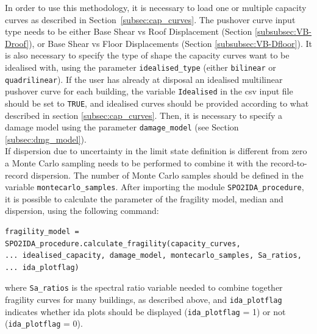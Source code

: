 In order to use this methodology, it is necessary to load one or multiple capacity curves as described in Section~\ref{subsec:cap_curves}. The pushover curve input type needs to be either Base Shear vs Roof Displacement (Section \ref{subsubsec:VB-Droof}), or Base Shear vs Floor Displacements (Section \ref{subsubsec:VB-Dfloor}). It is also necessary to specify the type of shape the capacity curves want to be idealised with, using the parameter \verb=idealised_type= (either \verb=bilinear= or \verb=quadrilinear=). If the user has already at disposal an idealised multilinear pushover curve for each building, the variable \verb=Idealised= in the csv input file should be set to \verb=TRUE=, and idealised curves should be provided according to what described in section \ref{subsec:cap_curves}. Then, it is necessary to specify a damage model using the parameter \verb=damage_model= (see Section \ref{subsec:dmg_model}).\\

If dispersion due to uncertainty in the limit state definition is different from zero a Monte Carlo sampling needs to be performed to combine it with the record-to-record dispersion. The number of Monte Carlo samples should be defined in the variable \verb=montecarlo_samples=.
After importing the module \verb=SPO2IDA_procedure=, it is possible to calculate the parameter of the fragility model, median and dispersion, using the following command:

\begin{Verbatim}[frame=single, commandchars=\\\{\}, samepage=true]
fragility_model = SPO2IDA_procedure.calculate_fragility(capacity_curves,
... idealised_capacity, damage_model, montecarlo_samples, Sa_ratios,
... ida_plotflag)
\end{Verbatim}

where \verb=Sa_ratios= is the spectral ratio variable needed to combine together fragility curves for many buildings, as described above, and \verb=ida_plotflag= indicates whether ida plots should be displayed (\verb=ida_plotflag= = 1) or not (\verb=ida_plotflag= = 0).